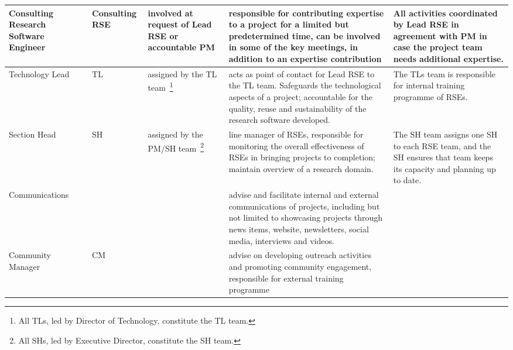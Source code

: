 \documentclass[11pt]{article}
\begin{document}
\begin{tabularx}{\linewidth}{p{}|p{}|p{}|p{}|p{}}
Consulting Research Software Engineer              & Consulting RSE        & involved at request of Lead RSE or accountable PM                                                                 & responsible for contributing expertise to a project for a limited but predetermined time, can be involved in some of the key meetings, in addition to an expertise contribution                                                        & All activities coordinated by Lead RSE in agreement with PM in case the project team needs additional expertise.                     \\\hline
Technology Lead                                    & TL                    & assigned by the TL team~\footnote{All TLs, led by Director of Technology, constitute the TL team.}                                                                                          & acts as point of contact for Lead RSE to the TL team. Safeguards the technological aspects of a project; accountable for the quality, reuse and sustainability of the research software developed.                                     & The TLs team is responsible for internal training programme of RSEs.                                                                 \\\hline
Section Head                                       & SH                    & assigned by the PM/SH team~\footnote{All SHs, led by Executive Director, constitute the SH team.}                                                                                       & line manager of RSEs, responsible for monitoring the overall effectiveness of RSEs in bringing projects to completion; maintain overview of a research domain.                                                                         & The SH team assigns one SH to each RSE team, and the SH ensures that team keeps its capacity and planning up to date.                \\\hline
Communications                                     &                       &                                                                                                                   & advise and facilitate internal and external communications of projects, including but not limited to showcasing projects through news items, website, newsletters, social media, interviews and videos.                                &                                                                                                                                      \\\hline
Community Manager                                  & CM                    &                                                                                                                   & advise on developing outreach activities and promoting community engagement, responsible for external training programme                                                                                                               &                                                                                                                                      \\\hline

\end{tabularx}
\end{document}
